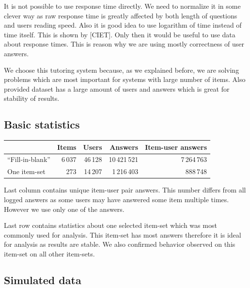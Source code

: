 \documentclass[
  digital, %
  table,   %
  nolof,     %
  nolot,     %
  nocover
]{fithesis3}
\begin{document}
It is not possible to use response time directly. We need to normalize it in some clever way as raw response time is greatly affected by both length of questions and users reading speed. Also it is good idea to use logarithm of time instead of time itself. This is shown by [CIET]. Only then it would be useful to use data about response times. This is reason why we are using mostly correctness of user answers.



We choose this tutoring system because, as we explained before, we are solving problems which are most important for systems with large number of items. Also provided dataset has a large amount of users and answers which is great for stability of results.

\subsection{Basic statistics}\label{basic-statistics}

\begin{center}
  \begin{tabular}{|l|r r r r|}
    \hline
     & Items & Users & Answers & Item-user answers \\
    \hline\hline
    ``Fill-in-blank'' & 6\,037 & 46\,128 & 10\,421\,521 & 7\,264\,763 \\
    \hline
    One item-set & 273 & 14\,207 & 1\,216\,403 & 888\,748 \\
    \hline
  \end{tabular}
\end{center}

Last column contains unique item-user pair answers. This number differs from all logged answers as some users may have answered some item multiple times. However we use only one of the answers.

Last row contains statistics about one selected item-set which was most commonly used for analysis. This item-set has most answers therefore it is ideal for analysis as results are stable. We also confirmed behavior observed on this item-set on all other item-sets.

\subsection{Simulated data}\label{simulated-data}
\end{document}
